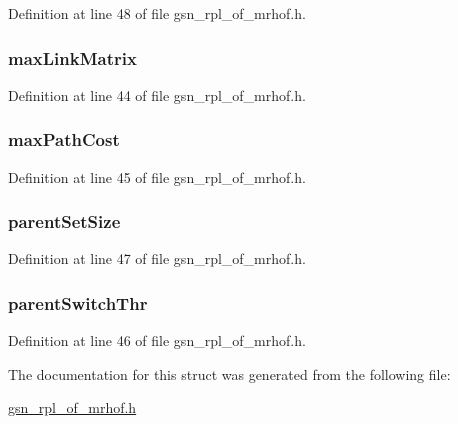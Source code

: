 Definition at line 48 of file gsn\_\-rpl\_\-of\_\-mrhof.h.

\hypertarget{a00206_a516d2a85f12de9d5df0cd4d114ceef53}{
\subsubsection[{maxLinkMatrix}]{ {\bf maxLinkMatrix}}}
\label{a00206_a516d2a85f12de9d5df0cd4d114ceef53}


Definition at line 44 of file gsn\_\-rpl\_\-of\_\-mrhof.h.

\hypertarget{a00206_aedf601ed094c3bf181e20d300d14f245}{
\subsubsection[{maxPathCost}]{ {\bf maxPathCost}}}
\label{a00206_aedf601ed094c3bf181e20d300d14f245}


Definition at line 45 of file gsn\_\-rpl\_\-of\_\-mrhof.h.

\hypertarget{a00206_af94e49d3425a329fe5efb7acf39d22a0}{
\subsubsection[{parentSetSize}]{ {\bf parentSetSize}}}
\label{a00206_af94e49d3425a329fe5efb7acf39d22a0}


Definition at line 47 of file gsn\_\-rpl\_\-of\_\-mrhof.h.

\hypertarget{a00206_ac1656804b7e4feec1bf5a4425d9635f6}{
\subsubsection[{parentSwitchThr}]{ {\bf parentSwitchThr}}}
\label{a00206_ac1656804b7e4feec1bf5a4425d9635f6}


Definition at line 46 of file gsn\_\-rpl\_\-of\_\-mrhof.h.



The documentation for this struct was generated from the following file:\begin{DoxyCompactItemize}
\item 
\hyperlink{a00581}{gsn\_\-rpl\_\-of\_\-mrhof.h}\end{DoxyCompactItemize}
